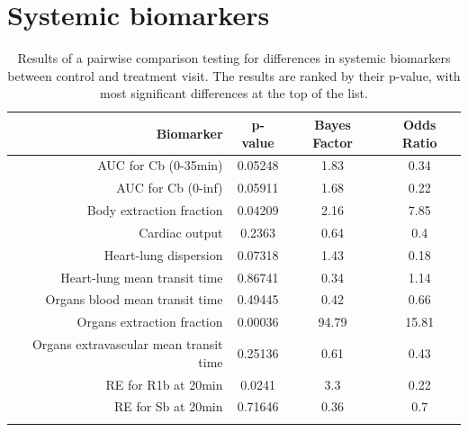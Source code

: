 \documentclass{epflreport}%
\begin{document}
\section{Systemic biomarkers}%
\label{sec:Systemicbiomarkers}%

%
\begin{longtable}{rccc}%
\hline%
Biomarker&p{-}value&Bayes Factor&Odds Ratio\\%
\hline%
AUC for Cb (0{-}35min)&0.05248&1.83&0.34\\%
AUC for Cb (0{-}inf)&0.05911&1.68&0.22\\%
Body extraction fraction&0.04209&2.16&7.85\\%
Cardiac output&0.2363&0.64&0.4\\%
Heart{-}lung dispersion&0.07318&1.43&0.18\\%
Heart{-}lung mean transit time&0.86741&0.34&1.14\\%
Organs blood mean transit time&0.49445&0.42&0.66\\%
Organs extraction fraction&0.00036&94.79&15.81\\%
Organs extravascular mean transit time&0.25136&0.61&0.43\\%
RE for R1b at 20min&0.0241&3.3&0.22\\%
RE for Sb at 20min&0.71646&0.36&0.7\\%
\hline%
\caption{Results of a pairwise comparison testing for differences in systemic biomarkers between control and treatment visit. The results are ranked by their p-value, with most significant differences at the top of the list.} \\%
\end{longtable}%
\end{document}
